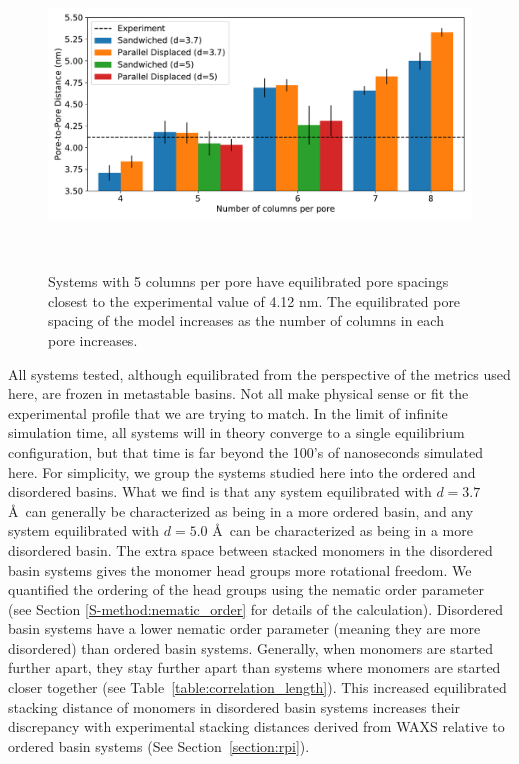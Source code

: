 \documentclass[journal=jpcbfk,manuscript=article]{achemso}
\begin{document}
  \begin{figure}[!htb]
	\centering
	\includegraphics[width=\linewidth]{p2p.pdf}
	\caption{Systems with 5 columns per pore have equilibrated pore spacings closest to
			 the experimental value of 4.12 nm. The equilibrated pore spacing of the model 	
			 increases as the number of columns in each pore increases.}~\label{fig:p2p}
  \end{figure}  
  
  All systems tested, although equilibrated from the perspective of the metrics
  used here, are frozen in metastable basins. Not all make physical sense or fit
  the experimental profile that we are trying to match. In the limit of infinite
  simulation time, all systems will in theory converge to a single equilibrium
  configuration, but that time is far beyond the 100's of nanoseconds simulated
  here. For simplicity, we group the systems studied here into the ordered and
  disordered basins. What we find is that any system equilibrated with
  $\mathit{d}=3.7$ \AA~can generally be characterized as being in a more ordered
  basin, and any system equilibrated with $\mathit{d}=5.0$ \AA~can be
  characterized as being in a more disordered basin. The extra space between
  stacked monomers in the disordered basin systems gives the monomer head groups
  more rotational freedom. We quantified the ordering of the head groups using
  the nematic order parameter (see Section \ref{S-method:nematic_order} for
  details of the calculation). Disordered basin systems have a lower nematic
  order parameter (meaning they are more disordered) than ordered basin systems.
  Generally, when monomers are started further apart, they stay further apart
  than systems where monomers are started closer together (see
  Table~\ref{table:correlation_length}). This increased equilibrated stacking
  distance of monomers in disordered basin systems increases their discrepancy
  with experimental stacking distances derived from WAXS relative to ordered
  basin systems (See Section~\ref{section:rpi}). 
  
\end{document}
